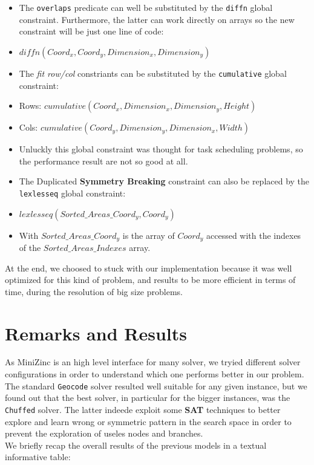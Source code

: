 \begin{itemize}
    \item The \texttt{overlaps} predicate can well be substituted by the \texttt{diffn} global constraint.
            Furthermore, the latter can work directly on arrays so the new constraint will be just one line of code:
    \item[] $diffn(Coord_x, Coord_y, Dimension_x, Dimension_y)$
    \item The \textit{fit row/col} constriants can be substituted by the \texttt{cumulative} global constraint:
    \item[] Rows: $cumulative(Coord_x, Dimension_x, Dimension_y, Height)$
    \item[] Cols: $cumulative(Coord_y, Dimension_y, Dimension_x, Width)$
    \item[] Unluckly this global constraint was thought for task scheduling problems, so the performance result are not so good at all.
    \item The Duplicated \textbf{Symmetry Breaking} constraint can also be replaced by the \texttt{lexlesseq} global constraint:
    \item[] $lexlesseq(Sorted\_Areas\_Coord_y, Coord_y)$
    \item[] With $Sorted\_Areas\_Coord_y$ is the array of $Coord_y$ accessed with the indexes of the $Sorted\_Areas\_Indexes$ array.   
\end{itemize}

At the end, we choosed to stuck with our implementation because it was well optimized for this kind of problem, and results to be more
efficient in terms of time, during the resolution of big size problems.




\section{Remarks and Results}
As MiniZinc is an high level interface for many solver, we tryied different solver configurations in order to understand which one performs better
in our problem. The standard \texttt{Geocode} solver resulted well suitable for any given instance, but we found out that the best solver, in particular
for the bigger instances, was the \texttt{Chuffed} solver. The latter indeede exploit some \textbf{SAT} techniques to better explore and learn wrong or symmetric
pattern in the search space in order to prevent the exploration of useles nodes and branches.\\

We briefly recap the overall results of the previous models in a textual informative table:

